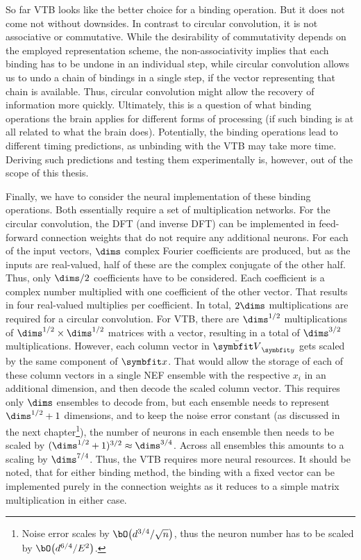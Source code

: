 So far VTB looks like the better choice for a binding operation.
But it does not come not without downsides.
In contrast to circular convolution, it is not associative or commutative.
While the desirability of commutativity depends on the employed representation scheme, the non-associativity implies that each binding has to be undone in an individual step, while circular convolution allows us to undo a chain of bindings in a single step, if the vector representing that chain is available.
Thus, circular convolution might allow the recovery of information more quickly.
Ultimately, this is a question of what binding operations the brain applies for different forms of processing (if such binding is at all related to what the brain does).
Potentially, the binding operations lead to different timing predictions, as unbinding with the VTB may take more time.
Deriving such predictions and testing them experimentally is, however, out of the scope of this thesis.

Finally, we have to consider the neural implementation of these binding operations.
Both essentially require a set of multiplication networks.
For the circular convolution, the DFT (and inverse DFT) can be implemented in feed-forward connection weights that do not require any additional neurons.
For each of the input vectors, $\dims$ complex Fourier coefficients are produced, but as the inputs are real-valued, half of these are the complex conjugate of the other half.
Thus, only $\dims / 2$ coefficients have to be considered.
Each coefficient is a complex number multiplied with one coefficient of the other vector.
That results in four real-valued multiplies per coefficient.
In total, $2\dims$ multiplications are required for a circular convolution.
For VTB, there are $\dims^{1/2}$ multiplications of $\dims^{1/2} \times \dims^{1/2}$ matrices with a vector, resulting in a total of $\dims^{3/2}$ multiplications.
However, each column vector in $\bar{\mat V}_{\vc y}$ gets scaled by the same component of $\vc x$.
That would allow the storage of each of these column vectors in a single NEF ensemble with the respective $x_i$ in an additional dimension, and then decode the scaled column vector.
This requires only $\dims$ ensembles to decode from, but each ensemble needs to represent $\dims^{1/2} + 1$ dimensions, and to keep the noise error constant (as discussed in the next chapter\footnote{Noise error scales by $\bO\big(d^{3/4}/\sqrt{n}\big)$, thus the neuron number has to be scaled by $\bO\big(d^{6/4}/E^2\big)$.}), the number of neurons in each ensemble then needs to be scaled by $(\dims^{1/2} + 1)^{3/2} \approx \dims^{3/4}$.  %
Across all ensembles this amounts to a scaling by $\dims^{7/4}$.
Thus, the VTB requires more neural resources.
It should be noted, that for either binding method, the binding with a fixed vector can be implemented purely in the connection weights as it reduces to a simple matrix multiplication in either case.

